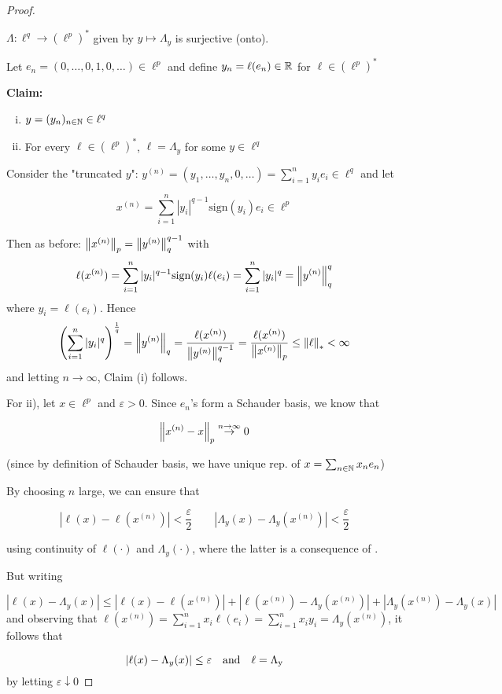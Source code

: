 \documentclass{article}
\begin{document}
\begin{proof}
	\begin{lemma}
		\(\Lambda: \ell^q \to (\ell^p)^*\) given by  \(y \mapsto \Lambda_y\) is surjective (onto).
	\end{lemma}
	Let  \(e_n = (0, \ldots, 0, 1, 0, \ldots) \in \ell^p\) and define  \(y_n = \ell(e_n) \in \mathbb{R} \)  for  \(\ell \in (\ell^p)^*\)

	\textbf{Claim:}
	\begin{enumerate}[i)]
		\item  \(y = (y_n)_{n \in \mathbb{N}} \in \ell^q\)
		\item  For every \(\ell \in (\ell^p)^*\), \(\ell = \Lambda_y\) for some  \(y \in \ell^q \)
	\end{enumerate}

	Consider the "truncated $y$":  \(y^{(n)}=(y_1, \ldots, y_n, 0, \ldots) = \sum_{i=1}^n y_i e_i \in \ell^q\) and let

	\[x^{(n)}=\sum_{i=1}^{n}|y_{i}|^{q-1} \textrm{sign}(y_i) e_i \in \ell^p\]

	Then as before:  \(\left\|{x^{(n)}}\right\|_p = \left\|{y^{(n)}}\right\|_q^{q-1}\)
	with
	\[
		\ell(x^{(n)})=\sum_{i=1}^{n}|y_{i}|^{q-1} \textrm{sign}(y_i) \ell(e_i) = \sum_{i=1}^n |y_i|^q=\left\|{y^{(n)}}\right\|^q_q
	\]
	where  \(y_i = \ell(e_i)\). Hence
	\[
		\left(\sum_{i=1}^n |y_i|^q \right)^{\frac{1}{q}} = \left\|{y^{(n)}}\right\|_q = \frac{\ell(x^{(n)})}{\left\|{y^{(n)}}\right\|_q^{q-1}} = \frac{\ell(x^{(n)})}{\left\|{x^{(n)}}\right\|_p} \leq \left\|{\ell}\right\|_* < \infty
	\]
	and letting  \(n \to \infty\), Claim (i) follows.

	For ii), let  \(x \in \ell^p\) and  \(\varepsilon > 0\). Since  \(e_n\)'s form a Schauder basis, we know that

	\[\left\|{x^{(n)}-x}\right\|_p \overset{n \to \infty}{\rightarrow} 0\]

	(since by definition of Schauder basis, we have unique rep. of  \(x = \sum_{n \in \mathbb{N}} x_n e_n\))

	By choosing  \(n\) large, we can ensure that

	\[|\ell(x)-\ell(x^{(n)})|<\frac{\varepsilon}{2} \qquad |\Lambda_y(x)-\Lambda_y(x^{(n)})| < \frac{\varepsilon}{2}\]

	using continuity of  \(\ell(\cdot)\) and  \(\Lambda_y(\cdot)\), where the latter is a consequence of .

	But writing

	\begin{equation}
		|\ell(x)-\Lambda_y(x)| \leq |\ell(x)- \ell(x^{(n)})| + |\ell(x^{(n)}) - \Lambda_y(x^{(n)})|+|\Lambda_y(x^{(n)})-\Lambda_y(x)|
	\end{equation}
	and observing that  \(\ell(x^{(n)})=\sum_{i=1}^n x_i \ell(e_i) = \sum_{i=1}^n x_i y_i = \Lambda_y(x^{(n)})\), it follows that

	\[
		|\ell(x)-\Lambda_y(x)| \leq \varepsilon \quad \rm{and} \quad \ell=\Lambda_y
	\]
	by letting  \(\varepsilon \downarrow 0\)
\end{proof}
\end{document}
